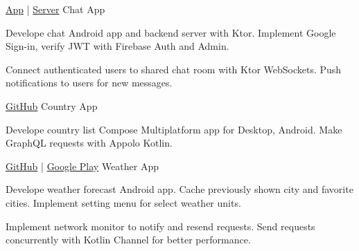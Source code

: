 \begin{cventries}
  \cventry
  {\href{https://github.com/nero240399/firebase-auth-chat-app}{App} | \href{https://github.com/nero240399/firebase-auth-chat-server}{Server}}
  {Chat App}
  {}
  {}
  {
    \begin{cvitems}
      \item {
      Develope chat Android app and backend server with Ktor.
      Implement Google Sign-in, verify JWT with Firebase Auth and Admin.
      }
      \item {
      Connect authenticated users to shared chat room with Ktor WebSockets.
      Push notifications to users for new messages.
      }
    \end{cvitems}        
  }
  
  \cventry
  {\href{https://github.com/nero240399/kmp-graphql-country-app}{GitHub}}
  {Country App}
  {}
  {}
  {
    \begin{cvitems}
      \item {
        Develope country list Compose Multiplatform app for Desktop, Android.
        Make GraphQL requests with Appolo Kotlin.
      }
    \end{cvitems}        
  }
  
  \cventry
  {\href{https://github.com/nero240399/clean-architecture-weather-app}{GitHub} | \href{https://play.google.com/store/apps/details?id=com.nero.weatherjourney}{Google Play}}
  {Weather App}
  {}
  {}
  {
    \begin{cvitems}
      \item {
      Develope weather forecast Android app.
      Cache previously shown city and favorite cities.
      Implement setting menu for select weather units.
      }
      \item {
      Implement network monitor to notify and resend requests.
      Send requests concurrently with Kotlin Channel for better performance.
      }
    \end{cvitems}        
  }
\end{cventries}